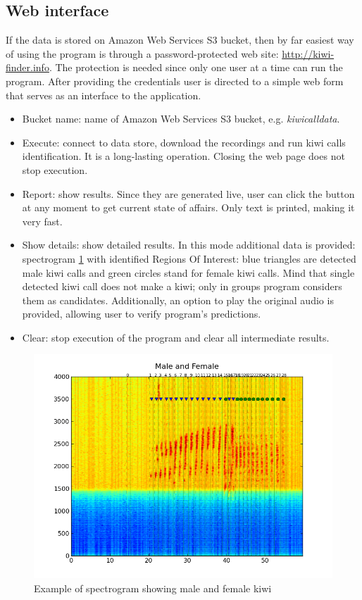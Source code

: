 \documentclass[paper=a4, fontsize=11pt]{scrartcl}	%
\numberwithin{equation}{section}		%
\numberwithin{figure}{section}			%
\numberwithin{table}{section}				%
\begin{document}
\subsection{Web interface}
\label{sec:web_interface}
If the data is stored on Amazon Web Services S3 bucket, then by far easiest way of using the program is through a password-protected web site: \url{http://kiwi-finder.info}. The protection is needed since only one user at a time can run the program. \newline
After providing the credentials user is directed to a simple web form that serves as an interface to the application. 
\begin{itemize}
	\item Bucket name: name of Amazon Web Services S3 bucket, e.g. \textit{kiwicalldata}.
	\item Execute: connect to data store, download the recordings and run kiwi calls identification. It is a long-lasting operation. Closing the web page does not stop execution.
	\item Report: show results. Since they are generated live, user can click the button at any moment to get current state of affairs. Only text is printed, making it very fast.
	\item Show details: show detailed results. In this mode additional data is provided: spectrogram \ref{fig:spectrogram} with identified Regions Of Interest: blue triangles are detected male kiwi calls and green circles stand for female kiwi calls. Mind that single detected kiwi call does not make a kiwi; only in groups program considers them as candidates. Additionally, an option to play the original audio is provided, allowing user to verify program's predictions.
	\item Clear: stop execution of the program and clear all intermediate results.
\end{itemize}

\begin{figure}[hbtp]
\label{fig:spectrogram}
\caption{Example of spectrogram showing male and female kiwi}
\centering
\includegraphics[scale=0.8]{spectrogram.png}
\end{figure}
\end{document}
